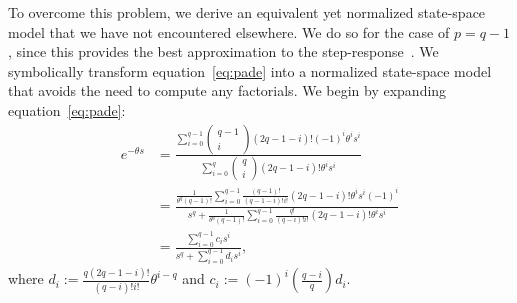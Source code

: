 To overcome this problem, we derive an equivalent yet normalized state-space model that we have not encountered elsewhere.
We do so for the case of $p = q - 1$, since this provides the best approximation to the step-response~\citep{vajta2000some}. We symbolically transform equation~\ref{eq:pade} into a normalized state-space model that avoids the need to compute any factorials.
We begin by expanding equation~\ref{eq:pade}:
\begin{align*}
[q-1/q]e^{-\theta s} &= \frac{\sum_{i=0}^{q-1} \begin{pmatrix}{q-1} \\ i\end{pmatrix} (2q - 1 - i)! (-1)^i \theta^i s^i}{\sum_{i=0}^q \begin{pmatrix}q \\ i\end{pmatrix} (2q - 1 - i)! \theta^i s^i} \\
&= \frac{\frac{1}{\theta^{q} (q-1)!} \sum_{i=0}^{q-1} \frac{(q-1)!}{(q-1-i)!i!} (2q - 1- i)! \theta^i s^i (-1)^i}{s^q + \frac{1}{\theta^q (q-1)!}  \sum_{i=0}^{q-1} \frac{q!}{(q-i)!i!} (2q - 1 - i)! \theta^i s^i} \\
&= \frac{\sum_{i=0}^{q-1} c_i s^i}{s^q + \sum_{i=0}^{q-1} d_i s^i} \text{,}
\end{align*}
where $d_i := \frac{q(2q - 1 - i)!}{(q-i)!i!} \theta^{i-q}$ and $c_i := (-1)^i \left( \frac{q-i}{q} \right) d_i$.

